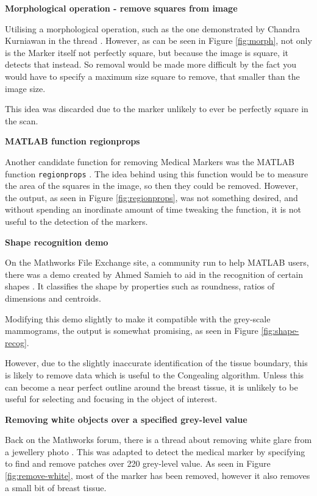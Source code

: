\textbf{Morphological operation - remove squares from image}

Utilising a morphological operation, such as the one demonstrated by Chandra Kurniawan in the thread \cite{detect_square}. However, as can be seen in Figure \ref{fig:morph}, not only is the Marker itself not perfectly square, but because the image is square, it detects that instead. So removal would be made more difficult by the fact you would have to specify a maximum size square to remove, that smaller than the image size.

This idea was discarded due to the marker unlikely to ever be perfectly square in the scan.

\textbf{MATLAB function regionprops}

Another candidate function for removing Medical Markers was the MATLAB function \texttt{regionprops} \cite{regionprops}. The idea behind using this function would be to measure the area of the squares in the image, so then they could be removed. However, the output, as seen in Figure \ref{fig:regionprops}, was not something desired, and without spending an inordinate amount of time tweaking the function, it is not useful to the detection of the markers.

\textbf{Shape recognition demo}

On the Mathworks File Exchange site, a community run to help MATLAB users, there was a demo created by Ahmed Samieh to aid in the recognition of certain shapes \cite{shape_recognition}. It classifies the shape by properties such as roundness, ratios of dimensions and centroids.

Modifying this demo slightly to make it compatible with the grey-scale mammograms, the output is somewhat promising, as seen in Figure \ref{fig:shape-recog}.

However, due to the slightly inaccurate identification of the tissue boundary, this is likely to remove data which is useful to the Congealing algorithm. Unless this can become a near perfect outline around the breast tissue, it is unlikely to be useful for selecting and focusing in the object of interest.

\textbf{Removing white objects over a specified grey-level value}

Back on the Mathworks forum, there is a thread about removing white glare from a jewellery photo \cite{remove_white}. This was adapted to detect the medical marker by specifying to find and remove patches over 220 grey-level value. As seen in Figure \ref{fig:remove-white}, most of the marker has been removed, however it also removes a small bit of breast tissue.

